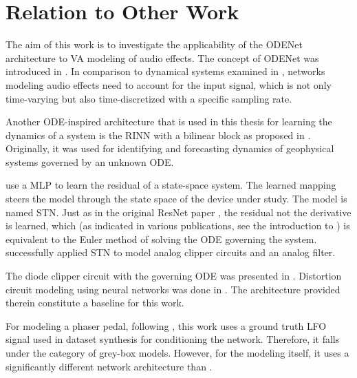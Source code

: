 \section{Relation to Other Work}
\label{sec:relation_to_other_work}
The aim of this work is to investigate the applicability of the ODENet architecture to \ac{VA} modeling of audio effects. The concept of ODENet was introduced in \cite{Chen2018}. In comparison to dynamical systems examined in \cite{Karlsson2019}, networks modeling audio effects need to account for the input signal, which is not only time-varying but also time-discretized with a specific sampling rate. 

Another \ac{ODE}-inspired architecture that is used in this thesis for learning the dynamics of a system is the \ac{RINN} with a bilinear block as proposed in \cite{Fablet2017,Ouala2019}. Originally, it was used for identifying and forecasting dynamics of geophysical systems governed by an unknown ODE.

\cite{Parker2019} use a \ac{MLP} to learn the residual of a state-space system. The learned mapping steers the model through the state space of the device under study. The model is named \ac{STN}. Just as in the original \ac{ResNet} paper \cite{He2015}, the residual not the derivative is learned, which (as indicated in various publications, see the introduction to \cite{Chen2018}) is equivalent to the Euler method of solving the \ac{ODE} governing the system. \cite{Parker2019} successfully applied \ac{STN} to model analog clipper circuits and an analog filter.

The diode clipper circuit with the governing \ac{ODE} was presented in \cite{Yeh2007,Yeh2008}. Distortion circuit modeling using neural networks was done in \cite{Wright2019,Wright2019a, Wrightetal2020}. The architecture provided therein constitute a baseline for this work.

For modeling a phaser pedal, following \cite{Wright2020}, this work uses a ground truth \ac{LFO} signal used in dataset synthesis for conditioning the network. Therefore, it falls under the category of grey-box models. However, for the modeling itself, it uses a significantly different network architecture than \cite{Wright2020}.

